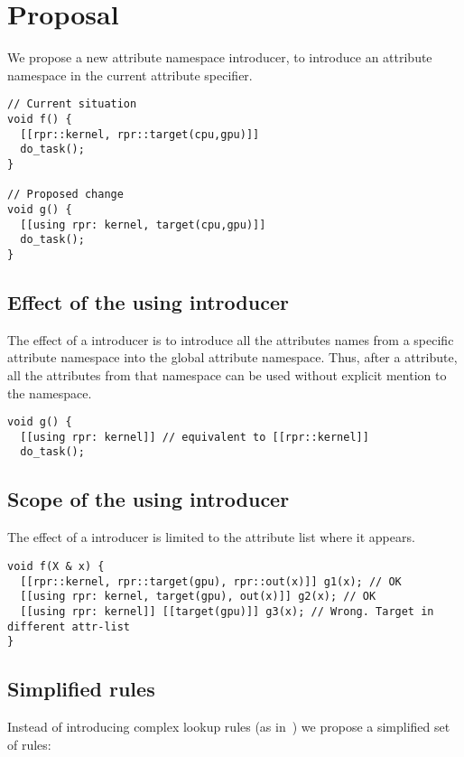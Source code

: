 \section{Proposal}

We propose a new attribute namespace introducer, to introduce an attribute
namespace in the current attribute specifier.

\begin{lstlisting}
// Current situation
void f() {
  [[rpr::kernel, rpr::target(cpu,gpu)]]
  do_task();
}

// Proposed change
void g() {
  [[using rpr: kernel, target(cpu,gpu)]]
  do_task();
}
\end{lstlisting}

\subsection{Effect of the using introducer}

The effect of a  introducer is to introduce all the attributes
names from a specific attribute namespace into the global attribute namespace.
Thus, after a  attribute, all the attributes from that namespace
can be used without explicit mention to the namespace.

\begin{lstlisting}
void g() {
  [[using rpr: kernel]] // equivalent to [[rpr::kernel]]
  do_task();
\end{lstlisting}

\subsection{Scope of the using introducer}
\label{scoping}

The effect of a  introducer is limited to the attribute list
where it appears.

\begin{lstlisting}
void f(X & x) {
  [[rpr::kernel, rpr::target(gpu), rpr::out(x)]] g1(x); // OK
  [[using rpr: kernel, target(gpu), out(x)]] g2(x); // OK
  [[using rpr: kernel]] [[target(gpu)]] g3(x); // Wrong. Target in different attr-list
}
\end{lstlisting}

\subsection{Simplified rules}

Instead of introducing complex lookup rules (as in~\cite{p0028r1}) we propose
a simplified set of rules:


